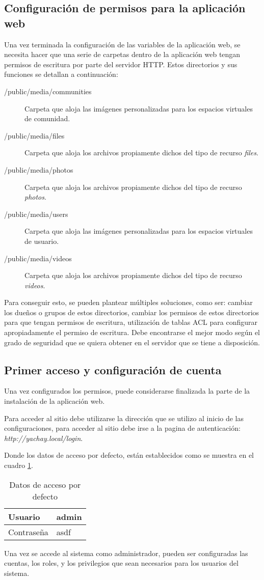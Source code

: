 \subsection{Configuración de permisos para la aplicación web}
Una vez terminada la configuración de las variables de la aplicación web, se
necesita hacer que una serie de carpetas dentro de la aplicación web tengan
permisos de escritura por parte del servidor HTTP. Estos directorios y sus
funciones se detallan a continuación:

\begin{description}
\item [/public/media/communities] Carpeta que aloja las imágenes personalizadas
para los espacios virtuales de comunidad.
\item [/public/media/files] Carpeta que aloja los archivos propiamente dichos
del tipo de recurso \emph{files}.
\item [/public/media/photos] Carpeta que aloja los archivos propiamente dichos
del tipo de recurso \emph{photos}.
\item [/public/media/users] Carpeta que aloja las imágenes personalizadas
para los espacios virtuales de usuario.
\item [/public/media/videos] Carpeta que aloja los archivos propiamente dichos
del tipo de recurso \emph{videos}.
\end{description}

Para conseguir esto, se pueden plantear múltiples soluciones, como ser: cambiar
los dueños o grupos de estos directorios, cambiar los permisos de estos
directorios para que tengan permisos de escritura, utilización de tablas ACL
para configurar apropiadamente el permiso de escritura. Debe encontrarse el
mejor modo según el grado de seguridad que se quiera obtener en el servidor que
se tiene a disposición.

\subsection{Primer acceso y configuración de cuenta}
Una vez configurados los permisos, puede considerarse finalizada la parte de la
instalación de la aplicación web.

Para acceder al sitio debe utilizarse la dirección que se utilizo al inicio de
las configuraciones, para acceder al sitio debe irse a la pagina de
autenticación: \emph{http://yachay.local/login}.

Donde los datos de acceso por defecto, están establecidos como se muestra en el
cuadro \ref{yachay_auth}.

\begin{table}
\centering
\begin{tabular}{|l|l|}
\hline
Usuario     & admin \\
\hline
Contraseña  & asdf \\
\hline
\end{tabular}
\caption{Datos de acceso por defecto}
\label{yachay_auth}
\end{table}

Una vez se accede al sistema como administrador, pueden ser configuradas las
cuentas, los roles, y los privilegios que sean necesarios para los usuarios del
sistema.

